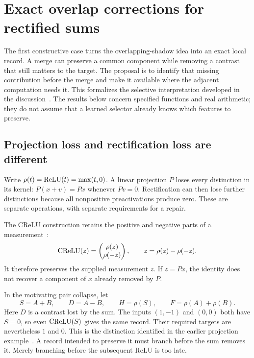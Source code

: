 \section{Exact overlap corrections for rectified sums}
\label{loc:section}

The first constructive case turns the overlapping-shadow idea into an exact
local record. A merge can preserve a common component while removing a
contrast that still matters to the target. The proposal is to identify that
missing contribution before the merge and make it available where the
adjacent computation needs it. This formalizes the selective interpretation
developed in the discussion~\cite{discussion}. The results below concern
specified functions and real arithmetic; they do not assume that a learned
selector already knows which features to preserve.

\subsection{Projection loss and rectification loss are different}
\label{loc:two_losses}

Write $\rho(t)=\operatorname{ReLU}(t)=\max(t,0)$. A linear projection $P$ loses every
distinction in its kernel: $P(x+v)=Px$ whenever $Pv=0$. Rectification can then
lose further distinctions because all nonpositive preactivations produce
zero. These are separate operations, with separate requirements for a repair.

The CReLU construction retains the positive and negative parts of a
measurement~\cite{crelu}:
\begin{equation}
 \operatorname{CReLU}(z)=
 \begin{pmatrix}\rho(z)\\\rho(-z)\end{pmatrix},
 \qquad z=\rho(z)-\rho(-z).
 \label{loc:crelu_inverse}
\end{equation}
It therefore preserves the supplied measurement $z$. If $z=Px$, the identity
does not recover a component of $x$ already removed by $P$.

In the motivating pair collapse, let
\begin{equation}
 S=A+B,\qquad D=A-B,\qquad
 H=\rho(S),\qquad F=\rho(A)+\rho(B).
 \label{loc:pair_definition}
\end{equation}
Here $D$ is a contrast lost by the sum. The inputs $(1,-1)$ and $(0,0)$ both
have $S=0$, so even $\operatorname{CReLU}(S)$ gives the same record. Their required targets
are nevertheless $1$ and $0$. This is the distinction identified in the
earlier projection example~\cite{projection}. A record intended to preserve
it must branch before the sum removes it. Merely branching before the
subsequent ReLU is too late.

